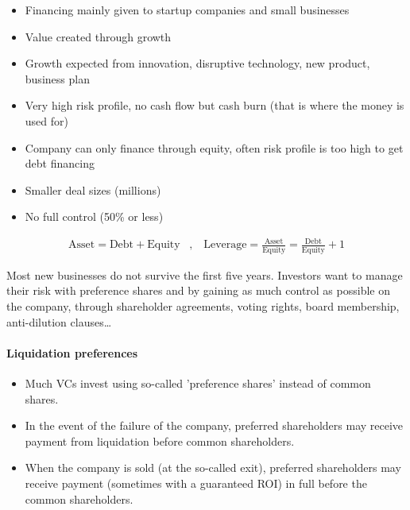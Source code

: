 \begin{definition}
    \begin{itemize}
        \item Financing mainly given to startup companies and small businesses
        \item Value created through growth
        \item Growth expected from innovation, disruptive technology, new product, business plan
        \item Very high risk profile, no cash flow but cash burn (that is where the money is used for)
        \item Company can only finance through equity, often risk profile is too high to get debt financing
        \item Smaller deal sizes (millions)
        \item No full control (50\% or less)
    \end{itemize}
\end{definition}

\begin{definition}
    \begin{align*}
        \text{Asset} = \text{Debt} + \text{Equity}
        \hspace{10pt} , \hspace{10pt}
        \text{Leverage} = \frac{\text{Asset}}{\text{Equity}} = \frac{\text{Debt}}{\text{Equity}} + 1
    \end{align*}
\end{definition}

Most new businesses do not survive the first five years.
Investors want to manage their risk with preference shares and by gaining as much
control as possible on the company, through shareholder agreements, voting rights,
board membership, anti-dilution clauses\dots

\paragraph{Liquidation preferences}
\begin{itemize}
    \item Much VCs invest using so-called 'preference shares' instead of common shares.
    \item In the event of the failure of the company, preferred shareholders may receive payment from liquidation before common shareholders.
    \item When the company is sold (at the so-called exit), preferred shareholders may receive
        payment (sometimes with a guaranteed ROI) in full before the common shareholders.
\end{itemize}

